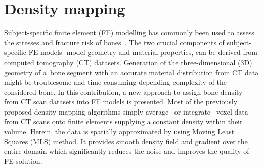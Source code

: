 \documentclass[11pt]{acmeArticle}
\numberwithin{equation}{section}
\begin{document}
\section{Density mapping}
\label{sec:dens_mapping}
Subject-specific finite element (FE) modelling has commonly been used to assess the stresses and fracture risk of bones~\citep{poelert2013patient,Helgason2008b,Yosibash2010}. The two crucial components of subject-specific FE models- model geometry and material properties, can be derived from computed tomography (CT) datasets. Generation of the three-dimensional (3D) geometry of a~bone segment with an accurate material distribution from CT data might be troublesome and time-consuming depending complexity of the considered bone. In this contribution, a new approach to assign bone density from CT scan datasets into FE models is presented. Most of the previously proposed density mapping algorithms simply average~\citep{zannoni1999material} or integrate~\citep{taddei2007material, schileo2008subject} voxel data from CT scans onto finite elements supplying a constant density within their volume. Herein, the data is spatially approximated by using Moving Least Squares (MLS) method. It provides smooth density field and gradient over the entire domain which significantly reduces the noise and improves the quality of FE solution. 
\end{document}
